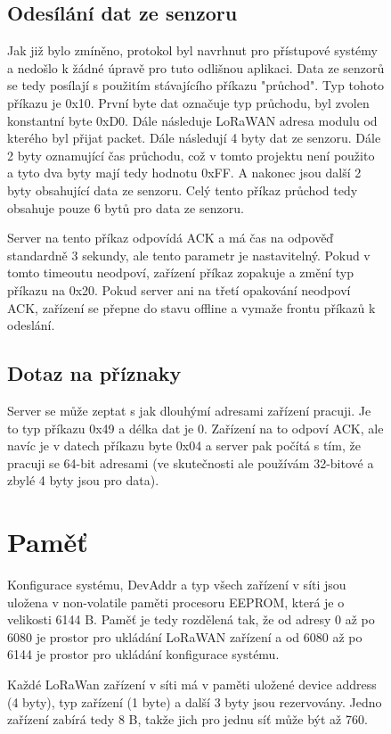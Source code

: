 \begin{figure}[!h]
\subsection{Odesílání dat ze senzoru}
Jak již bylo zmíněno, protokol byl navrhnut pro přístupové systémy a nedošlo k žádné úpravě pro tuto odlišnou aplikaci. Data ze senzorů se tedy posílají s použitím stávajícího příkazu "průchod".
Typ tohoto příkazu je 0x10. První byte dat označuje typ průchodu, byl zvolen konstantní byte 0xD0.
Dále následuje LoRaWAN adresa modulu od kterého byl přijat packet. Dále následují 4 byty dat ze senzoru. Dále 2 byty oznamující čas průchodu, což v tomto projektu není použito a tyto dva byty mají tedy hodnotu 0xFF. A nakonec jsou další 2 byty obsahující data ze senzoru.
Celý tento příkaz průchod tedy obsahuje pouze 6 bytů pro data ze senzoru.

Server na tento příkaz odpovídá ACK a má čas na odpověď standardně 3 sekundy, ale tento parametr je nastavitelný. Pokud v tomto timeoutu neodpoví, zařízení  příkaz zopakuje a změní typ příkazu na 0x20. Pokud server ani na třetí opakování neodpoví ACK, zařízení se přepne do stavu offline a vymaže frontu příkazů k odeslání.


\subsection{Dotaz na příznaky}
Server se může zeptat s jak dlouhýmí adresami zařízení pracuji. Je to typ příkazu 0x49 a délka dat je 0. Zařízení na to odpoví ACK, ale navíc je v datech příkazu byte 0x04 a server pak počítá s tím, že pracuji se 64-bit adresami (ve skutečnosti ale používám 32-bitové a zbylé 4 byty jsou pro data).


\section{Paměť}
Konfigurace systému, DevAddr a typ všech zařízení v síti jsou uložena v non-volatile paměti procesoru EEPROM, která je o velikosti 6144 B. 
Paměť je tedy rozdělená tak, že od adresy 0 až po 6080 je prostor pro ukládání LoRaWAN zařízení a od 6080 až po 6144 je prostor pro ukládání konfigurace systému.

Každé LoRaWan zařízení v síti má v paměti uložené device address (4 byty), typ zařízení (1 byte) a další 3 byty jsou rezervovány. 
Jedno zařízení zabírá tedy 8 B, takže jich pro jednu síť může být až 760.



\end{figure}
